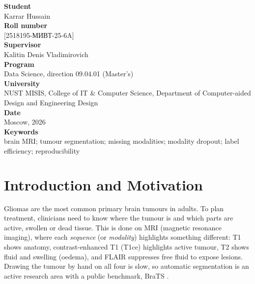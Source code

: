 \documentclass[11pt,a4paper]{article}
\newcommand{\tbp}{\textcolor{accent}{[2518195-МИВТ-25-6A]}}
\begin{document}
\begin{minipage}[t]{0.29\linewidth}\vspace{0pt}
  \setlength{\fboxsep}{9pt}
  \colorbox{sidebg}{\parbox{\dimexpr\linewidth-2\fboxsep\relax}{\raggedright\headfont\footnotesize{}
    {\bfseries\color{accent} Student}\\ Karrar Hussain\\[5pt]
    {\bfseries\color{accent} Roll number}\\ \tbp\\[5pt]
    {\bfseries\color{accent} Supervisor}\\ Kalitin Denis Vladimirovich\\[5pt]
    {\bfseries\color{accent} Program}\\ Data Science, direction 09.04.01 (Master's)\\[5pt]
    {\bfseries\color{accent} University}\\ NUST MISIS, College of IT \& Computer Science, Department of Computer-aided Design and Engineering Design\\[5pt]
    {\bfseries\color{accent} Date}\\ Moscow, 2026\\[5pt]
    {\bfseries\color{accent} Keywords}\\ brain MRI; tumour segmentation; missing modalities; modality dropout; label efficiency; reproducibility}}
\end{minipage}

\vspace{8pt}
\noindent\setlength{\fboxsep}{8pt}

\section{Introduction and Motivation}
Gliomas are the most common primary brain tumours in adults. To plan treatment, clinicians need to know where the tumour is and which parts are active, swollen or dead tissue. This is done on MRI (magnetic resonance imaging), where each \emph{sequence} (or \emph{modality}) highlights something different: T1 shows anatomy, contrast-enhanced T1 (T1ce) highlights active tumour, T2 shows fluid and swelling (oedema), and FLAIR suppresses free fluid to expose lesions. Drawing the tumour by hand on all four is slow, so automatic segmentation is an active research area with a public benchmark, BraTS \cite{menze2015,bakas2018}.
\end{document}
